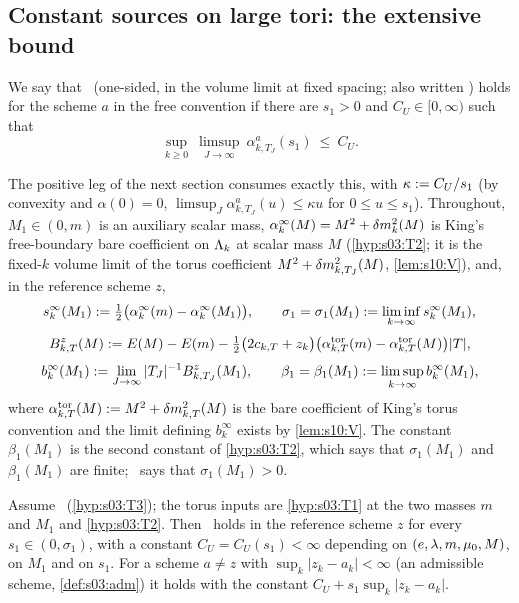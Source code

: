 \subsection{Constant sources on large tori: the extensive bound}

\begin{definition}\label{def:s10:I2}
We say that \Itwo\ (one-sided, in the volume limit at fixed spacing; also written \UVS) holds for the scheme $a$ in the free convention if there are $s_1>0$ and $C_U\in[0,\infty)$ such that
\begin{equation}\label{eq:s10:I2}
\sup_{k\ge0}\ \limsup_{J\to\infty}\ \alpha^a_{k,T_J}(s_1)\ \le\ C_U .
\end{equation}
\end{definition}

The positive leg of the next section consumes exactly this, with $\kappa:= C_U/s_1$ (by convexity and $\alpha(0)=0$, $\limsup_J\alpha^a_{k,T_J}(u)\le\kappa u$ for $0\le u\le s_1$). Throughout, $M_1\in(0,m)$ is an auxiliary scalar mass, $\alpha^\infty_k(M)=M^2+\delta m^2_k(M)$ is King's free-boundary bare coefficient on $\Lambda_k$ at scalar mass $M$ (\cref{hyp:s03:T2}; it is the fixed-$k$ volume limit of the torus coefficient $M^2+\delta m^2_{k,T_J}(M)$, \cref{lem:s10:V}), and, in the reference scheme $z$,
\[
s^\infty_k(M_1):=\tfrac12\big(\alpha^\infty_k(m)-\alpha^\infty_k(M_1)\big),\qquad
\sigma_1=\sigma_1(M_1):=\liminf_{k\to\infty}s^\infty_k(M_1),
\]
\[
B^z_{k,T}(M):= E(M)-E(m)-\tfrac12\big(2c_{k,T}+z_k\big)\big(\alpha^{\mathrm{tor}}_{k,T}(m)-\alpha^{\mathrm{tor}}_{k,T}(M)\big)|T|,
\]
\[
b^\infty_k(M_1):=\lim_{J\to\infty}|T_J|^{-1}B^z_{k,T_J}(M_1),\qquad
\beta_1=\beta_1(M_1):=\limsup_{k\to\infty}b^\infty_k(M_1),
\]
where $\alpha^{\mathrm{tor}}_{k,T}(M):= M^2+\delta m^2_{k,T}(M)$ is the bare coefficient of King's torus convention and the limit defining $b^\infty_k$ exists by \cref{lem:s10:V}. The constant $\beta_1(M_1)$ is the second constant of \cref{hyp:s03:T2}, which says that $\sigma_1(M_1)$ and $\beta_1(M_1)$ are finite; \Tthree\ says that $\sigma_1(M_1)>0$.

\begin{proposition}\label{prop:s10:U}
Assume \Tthree\ (\cref{hyp:s03:T3}); the torus inputs are \cref{hyp:s03:T1} at the two masses $m$ and $M_1$ and \cref{hyp:s03:T2}. Then \Itwo\ holds in the reference scheme $z$ for every $s_1\in(0,\sigma_1)$, with a constant $C_U=C_U(s_1)<\infty$ depending on $(e,\lambda,m,\mu_0,M)$, on $M_1$ and on $s_1$. For a scheme $a\ne z$ with $\sup_k|z_k-a_k|<\infty$ (an admissible scheme, \cref{def:s03:adm}) it holds with the constant $C_U+s_1\sup_k|z_k-a_k|$.
\end{proposition}

